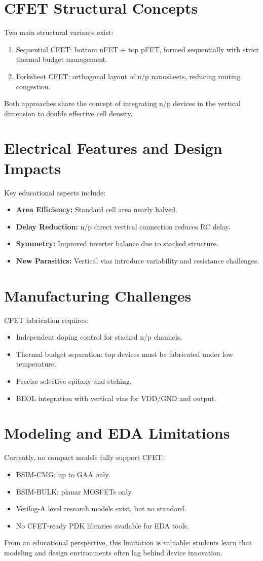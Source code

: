 \documentclass[conference]{IEEEtran}
\begin{document}
\section{CFET Structural Concepts}
Two main structural variants exist:
\begin{enumerate}
\item Sequential CFET: bottom nFET + top pFET, formed sequentially
with strict thermal budget management.
\item Forksheet CFET: orthogonal layout of n/p nanosheets, reducing
routing congestion.
\end{enumerate}
Both approaches share the concept of integrating n/p devices in the
vertical dimension to double effective cell density.

\section{Electrical Features and Design Impacts}
Key educational aspects include:
\begin{itemize}
\item \textbf{Area Efficiency:} Standard cell area nearly halved.
\item \textbf{Delay Reduction:} n/p direct vertical connection reduces
RC delay.
\item \textbf{Symmetry:} Improved inverter balance due to stacked
structure.
\item \textbf{New Parasitics:} Vertical vias introduce variability and
resistance challenges.
\end{itemize}

\section{Manufacturing Challenges}
CFET fabrication requires:
\begin{itemize}
\item Independent doping control for stacked n/p channels.
\item Thermal budget separation: top devices must be fabricated under
low temperature.
\item Precise selective epitaxy and etching.
\item BEOL integration with vertical vias for VDD/GND and output.
\end{itemize}

\section{Modeling and EDA Limitations}
Currently, no compact models fully support CFET:
\begin{itemize}
\item BSIM-CMG: up to GAA only.
\item BSIM-BULK: planar MOSFETs only.
\item Verilog-A level research models exist, but no standard.
\item No CFET-ready PDK libraries available for EDA tools.
\end{itemize}
From an educational perspective, this limitation is valuable: students
learn that modeling and design environments often lag behind device
innovation.
\end{document}
